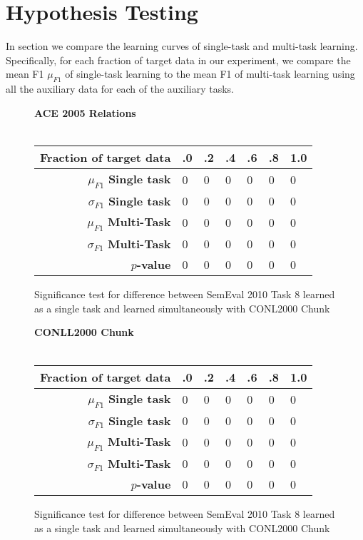 \section{Hypothesis Testing}
In section we compare the learning curves of single-task and multi-task learning. Specifically, for each fraction of target data in our experiment, we compare the mean F1 $\mu_{F1}$ of single-task learning to the mean F1 of multi-task learning using all the auxiliary data for each of the auxiliary tasks.
\vspace{3cm}
\begin{figure}[h]
	\hspace*{-3cm}\textbf{ACE 2005 Relations}
	\\\\
	\centering
	\begin{tabular}{r | l | l | l | l | l | l}
		\textbf{Fraction of target data} & .0 & .2 & .4 & .6 & .8 & 1.0 \\  \hline
		$\mu_{F1}$ \textbf{Single task} & 0 & 0 & 0 & 0 & 0 & 0\\
		$\sigma_{F1}$ \textbf{Single task} & 0 & 0 & 0 & 0 & 0 & 0\\
		$\mu_{F1}$ \textbf{Multi-Task} & 0 & 0 & 0 & 0 & 0 & 0\\
		$\sigma_{F1}$ \textbf{Multi-Task} & 0 & 0 & 0 & 0 & 0 & 0\\
		$p$\textbf{-value} & 0 & 0 & 0 & 0 & 0 & 0
	\end{tabular}
	\caption{Significance test for difference between SemEval 2010 Task 8 learned as a single task and learned simultaneously with CONL2000 Chunk}
\end{figure}
\begin{figure}[h]
	\hspace*{-3cm}\textbf{CONLL2000 Chunk}
	\\\\
	\centering
	\begin{tabular}{r | l | l | l | l | l | l}
		\textbf{Fraction of target data} & .0 & .2 & .4 & .6 & .8 & 1.0 \\  \hline
		$\mu_{F1}$ \textbf{Single task} & 0 & 0 & 0 & 0 & 0 & 0\\
		$\sigma_{F1}$ \textbf{Single task} & 0 & 0 & 0 & 0 & 0 & 0\\
		$\mu_{F1}$ \textbf{Multi-Task} & 0 & 0 & 0 & 0 & 0 & 0\\
		$\sigma_{F1}$ \textbf{Multi-Task} & 0 & 0 & 0 & 0 & 0 & 0\\
		$p$\textbf{-value} & 0 & 0 & 0 & 0 & 0 & 0
	\end{tabular}
	\caption{Significance test for difference between SemEval 2010 Task 8 learned as a single task and learned simultaneously with CONL2000 Chunk}
\end{figure}
